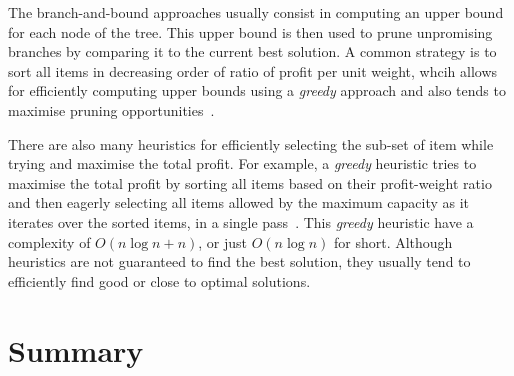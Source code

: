 The branch-and-bound approaches usually consist in computing an upper bound for each node of the tree.
This upper bound is then used to prune unpromising branches by comparing it to the current best solution.
A common strategy is to sort all items in decreasing order of ratio of profit per unit weight, whcih allows for efficiently computing upper bounds using a \textit{greedy} approach and also tends to maximise pruning opportunities~\citep{martello77,martello00}.

There are also many heuristics for efficiently selecting the sub-set of item while trying and maximise the total profit.
For example, a \textit{greedy} heuristic tries to maximise the total profit by sorting all items based on their profit-weight ratio and then eagerly selecting all items allowed by the maximum capacity as it iterates over the sorted items, in a single pass~\citep{dantzig57}.
This \textit{greedy} heuristic have a complexity of $O(n\log{n} + n)$, or just $O(n\log{n})$ for short.
Although heuristics are not guaranteed to find the best solution, they usually tend to efficiently find good or close to optimal solutions.

\section{Summary}
